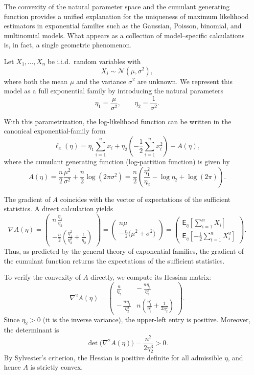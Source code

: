 The convexity of the natural parameter space and the cumulant generating function provides a
unified explanation for the uniqueness of maximum likelihood estimators in exponential
families such as the Gaussian, Poisson, binomial, and multinomial models.
What appears as a collection of model--specific calculations is, in fact, a single geometric
phenomenon.


\begin{ex}
Let \(X_1,\dots,X_n\) be i.i.d.\ random variables with
\[
X_i \sim \mathcal{N}(\mu,\sigma^2),
\]
where both the mean \(\mu\) and the variance \(\sigma^2\) are unknown.  
We represent this model as a full exponential family by introducing the natural
parameters
\[
\eta_1 = \frac{\mu}{\sigma^2},
\qquad
\eta_2 = \frac{1}{\sigma^2}.
\]

With this parametrization, the log-likelihood function can be written in the
canonical exponential-family form
\[
\ell_x(\eta)
= \eta_1 \sum_{i=1}^n x_i
  + \eta_2 \left(-\frac{1}{2}\sum_{i=1}^n x_i^2 \right)
  - A(\eta),
\]
where the cumulant generating function (log-partition function) is given by
\[
A(\eta)
= \frac{n}{2}\frac{\mu^2}{\sigma^2}
  + \frac{n}{2}\log(2\pi\sigma^2)
= \frac{n}{2}\left(
    \frac{\eta_1^2}{\eta_2}
    - \log \eta_2
    + \log(2\pi)
  \right).
\]

The gradient of \(A\) coincides with the vector of expectations of the sufficient
statistics. A direct calculation yields
\[
\nabla A(\eta)
=
\begin{pmatrix}
\displaystyle n\,\frac{\eta_1}{\eta_2} \\[0.6em]
\displaystyle -\frac{n}{2}\left(
  \frac{\eta_1^2}{\eta_2^2} + \frac{1}{\eta_2}
\right)
\end{pmatrix}
=
\begin{pmatrix}
n\mu \\[0.4em]
-\frac{n}{2}\bigl(\mu^2+\sigma^2\bigr)
\end{pmatrix}
=
\begin{pmatrix}
\mathsf{E}_\eta\!\left[\sum\limits_{i=1}^n X_i\right] \\[0.6em]
\mathsf{E}_\eta\!\left[-\frac{1}{2}\sum\limits_{i=1}^n X_i^2\right]
\end{pmatrix}.
\]
Thus, as predicted by the general theory of exponential families, the gradient of
the cumulant function returns the expectations of the sufficient statistics.

To verify the convexity of \(A\) directly, we compute its Hessian matrix:
\[
\nabla^2 A(\eta)
=
\begin{pmatrix}
\displaystyle \frac{n}{\eta_2}
&
\displaystyle -\,\frac{n\eta_1}{\eta_2^2}
\\[0.8em]
\displaystyle -\,\frac{n\eta_1}{\eta_2^2}
&
\displaystyle n\!\left(
  \frac{\eta_1^2}{\eta_2^3}
  + \frac{1}{2\eta_2^2}
\right)
\end{pmatrix}.
\]
Since \(\eta_2>0\) (it is the inverse variance), the upper-left entry is positive.
Moreover, the determinant is
\[
\det\bigl(\nabla^2 A(\eta)\bigr)
= \frac{n^2}{2\eta_2^3} > 0.
\]
By Sylvester’s criterion, the Hessian is positive definite for all admissible
\(\eta\), and hence \(A\) is strictly convex.


\end{ex}
